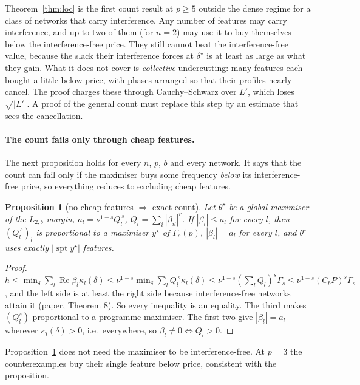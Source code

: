 \documentclass[11pt]{article}
\newtheorem{proposition}[theorem]{Proposition}
\theoremstyle{definition}
\renewcommand{\Re}{\operatorname{Re}}
\begin{document}
Theorem~\ref{thm:loc} is the first count result at $p\ge5$ outside the dense regime for a class of networks that carry
interference.  Any number of features may carry interference, and up to two of them (for $n=2$) may use it to buy
themselves below the interference-free price.  They still cannot beat the interference-free value, because the slack
their interference forces at $\delta^\star$ is at least as large as what they gain.  What it does not cover is
\emph{collective} undercutting: many features each bought a little below price, with phases arranged so that their
profiles nearly cancel.  The proof charges these through Cauchy--Schwarz over $L'$, which loses $\sqrt{|L'|}$.  A proof of
the general count must replace this step by an estimate that sees the cancellation.

\paragraph{The count fails only through cheap features.}  The next proposition holds for every $n$, $p$, $b$ and every
network.  It says that the count can fail only if the maximiser buys some frequency \emph{below} its interference-free
price, so everything reduces to excluding cheap features.
\begin{proposition}[no cheap features $\Rightarrow$ exact count]\label{prop:nocheap}
Let $\theta^\star$ be a global maximiser of the $L_{2,b}$-margin, $a_l=\nu^{1-s}Q_l^{\,s}$, $Q_l=\sum_i|\beta_{il}|^r$.  If
$|\beta_l|\le a_l$ for every $l$, then $(Q_l^{\,s})_l$ is proportional to a maximiser $y^\star$ of $\Gamma_s(p)$, $|\beta_l|=a_l$ for
every $l$, and $\theta^\star$ uses exactly $|\operatorname{spt}y^\star|$ features.
\end{proposition}
\begin{proof}
$h\le\min_\delta\sum_l\Re\beta_l\kappa_l(\delta)\le\nu^{1-s}\min_\delta\sum_lQ_l^{\,s}\kappa_l(\delta)\le\nu^{1-s}(\sum_lQ_l)^s\Gamma_s\le\nu^{1-s}(C_bP)^s\Gamma_s$,
and the left side is at least the right side because interference-free networks attain it (paper, Theorem 8).  So
every inequality is an equality.  The third makes $(Q_l^s)$ proportional to a programme maximiser.  The first two give
$|\beta_l|=a_l$ wherever $\kappa_l(\delta)>0$, i.e.\ everywhere, so $\beta_l\ne0\iff Q_l>0$.
\end{proof}
Proposition~\ref{prop:nocheap} does not need the maximiser to be interference-free.  At $p=3$ the counterexamples buy their single
feature below price, consistent with the proposition.
\end{document}
